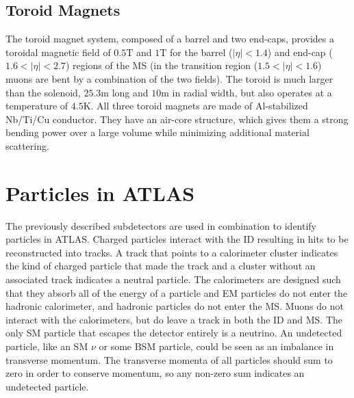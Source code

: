 \subsection{Toroid Magnets}

The toroid magnet system, composed of a barrel and two end-caps, provides a toroidal magnetic field of $0.5 \textrm{T}$ and $1 \textrm{T}$ for the barrel ($|\eta| < 1.4$) and end-cap ($1.6 <|\eta| < 2.7$) regions of the \ac{MS} (in the transition region ($1.5 < |\eta| < 1.6$) muons are bent by a combination of the two fields). The toroid is much larger than the solenoid, $25.3 \textrm{m}$ long and $10 \textrm{m}$ in radial width, but also operates at a temperature of $4.5 \textrm{K}$. All three toroid magnets are made of Al-stabilized Nb/Ti/Cu conductor. They have an air-core structure, which gives them a strong bending power over a large volume while minimizing additional material scattering. 




\section{Particles in ATLAS}
The previously described subdetectors are used in combination to identify particles in \ac{ATLAS}. Charged particles interact with the \ac{ID} resulting in hits to be reconstructed into tracks. A track that points to a calorimeter cluster indicates the kind of charged particle that made the track and a cluster without an associated track indicates a neutral particle. The calorimeters are designed such that they absorb all of the energy of a particle and \ac{EM} particles do not enter the hadronic calorimeter, and hadronic particles do not enter the \ac{MS}. Muons do not interact with the calorimeters, but do leave a track in both the \ac{ID} and \ac{MS}. The only \ac{SM} particle that escapes the detector entirely is a neutrino. An undetected particle, like an \ac{SM} $\nu$ or some \ac{BSM} particle, could be seen as an imbalance in transverse momentum. The transverse momenta of all particles should sum to zero in order to conserve momentum, so any non-zero sum indicates an undetected particle.


